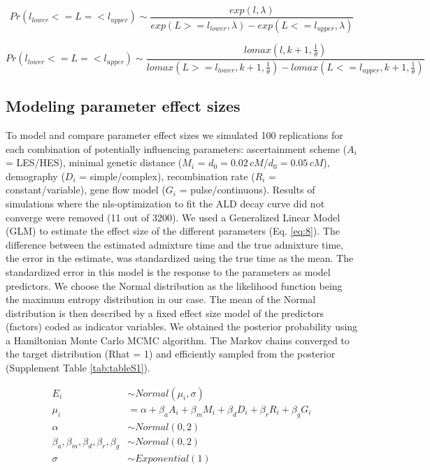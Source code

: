 \documentclass[]{article}
\begin{document}
\begin{equation}
\label{eq:7}
Pr(l_{lower}<=L=<l_{upper}) \sim \frac{exp(l,\lambda)}{exp(L>=l_{lower},\lambda)-exp(L<=l_{upper},\lambda)}
\end{equation}

\begin{equation}
\label{eq:8}
Pr(l_{lower}<=L=<l_{upper}) \sim \frac{lomax(l,k+1,\frac{1}\theta)}{lomax(L>=l_{lower},k+1,\frac{1}\theta)-lomax(L<=l_{upper},k+1,\frac{1}\theta)}
\end{equation}

\subsection{Modeling parameter effect sizes}\label{modeling prameter effect sizes}

To model and compare parameter effect sizes we simulated 100
replications for each combination of potentially influencing
parameters: ascertainment scheme ($A_i$ = LES/HES), minimal genetic distance
($M_i$ = \(d_{0}=0.02\,cM\)/\(d_{0}=0.05\,cM\)), demography ($D_i$ = simple/complex),
recombination rate ($R_i$ = constant/variable), gene flow model
($G_i$ = pulse/continuous). Results of simulations where the nls-optimization to
fit the ALD decay curve did not converge were removed (11 out of 3200).
We used a Generalized Linear Model (GLM)  to estimate the effect
size of the different parameters (Eq.
\ref{eq:8}). The difference between the estimated
admixture time and the true admixture time, the error in the estimate,
was standardized using the true time as the mean. The standardized error in this model is the response to the parameters as model
predictors. We choose the Normal distribution as the likelihood function being the maximum entropy distribution in our case. The mean of the Normal distribution is then described by a fixed effect size model of the predictors (factors) coded as indicator variables. We obtained the posterior probability using a Hamiltonian Monte Carlo MCMC algorithm. The Markov chains converged to the target distribution (Rhat = 1) and efficiently sampled from the posterior (Supplement Table \ref{tab:tableS1}).  

\begin{equation}\label{eq:8}
\begin{split}
E_i &\sim Normal(\mu_i,\sigma) \\
\mu_i &= \alpha + \beta_aA_i + \beta_mM_i + \beta_dD_i + \beta_rR_i + \beta_gG_i \\
\alpha &\sim Normal(0,2) \\
\beta_a,\beta_m,\beta_d,\beta_r,\beta_g &\sim Normal(0,2) \\
\sigma &\sim Exponential(1)
\end{split}
\end{equation}
\end{document}
